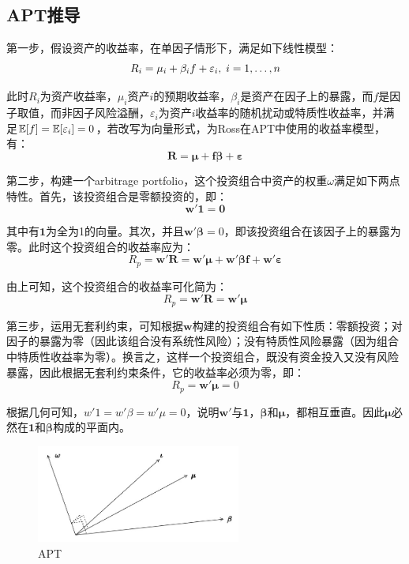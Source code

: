 \documentclass[11pt]{article}
\begin{document}
\begin{appendices}
\section{APT推导}

第一步，假设资产的收益率，在单因子情形下，满足如下线性模型：
\begin{equation*}
    R_i = \mu_i + \beta_i f + \varepsilon_i ,\; i =1,\dots,n
\end{equation*}

此时$R_i$为资产收益率，$\mu_i$资产$i$的预期收益率，$\beta_i$是资产在因子上的暴露，而$f$是因子取值，而非因子风险溢酬，$\varepsilon_i$为资产$i$收益率的随机扰动或特质性收益率，并满足$\mathbb{E}[f]=\mathbb{E}[\varepsilon_i]=0$，若改写为向量形式，为Ross在APT中使用的收益率模型，有：
\begin{equation*}
    \bm{R} = \bm{\mu + f\beta + \varepsilon}
\end{equation*}

第二步，构建一个arbitrage portfolio，这个投资组合中资产的权重$\omega$满足如下两点特性。首先，该投资组合是零额投资的，即：
\begin{equation*}
    \bm{w' 1 = 0}
\end{equation*}

其中有$\bm{1}$为全为1的向量。其次，并且$\bm{w'\beta}=0$，即该投资组合在该因子上的暴露为零。此时这个投资组合的收益率应为：
\begin{equation*}
    R_p = \bm{w'R = w'\mu + w'\beta f + w'\varepsilon}
\end{equation*}

由上可知，这个投资组合的收益率可化简为：
\begin{equation*}
    R_p = \bm{w'R = w'\mu} 
\end{equation*}

第三步，运用无套利约束，可知根据$\bm{w}$构建的投资组合有如下性质：零额投资；对因子的暴露为零（因此该组合没有系统性风险）；没有特质性风险暴露（因为组合中特质性收益率为零）。换言之，这样一个投资组合，既没有资金投入又没有风险暴露，因此根据无套利约束条件，它的收益率必须为零，即：
\begin{equation*}
    R_p = \bm{w'\mu} = 0
\end{equation*}

根据几何可知，$w' 1 = w' \beta = w'\mu = 0$，说明$\bm{w'}$与$\bm{1}$，$\bm{\beta}$和$\bm{\mu}$，都相互垂直。因此$\bm{\mu}$必然在$\bm{1}$和$\bm{\beta}$构成的平面内。

\begin{figure}[H]
    \centering
    \includegraphics[width=0.6\textwidth]{fig/apt.jpg}
    \caption{APT}
    \label{fig:apt}
\end{figure}


\end{appendices}
\end{document}
